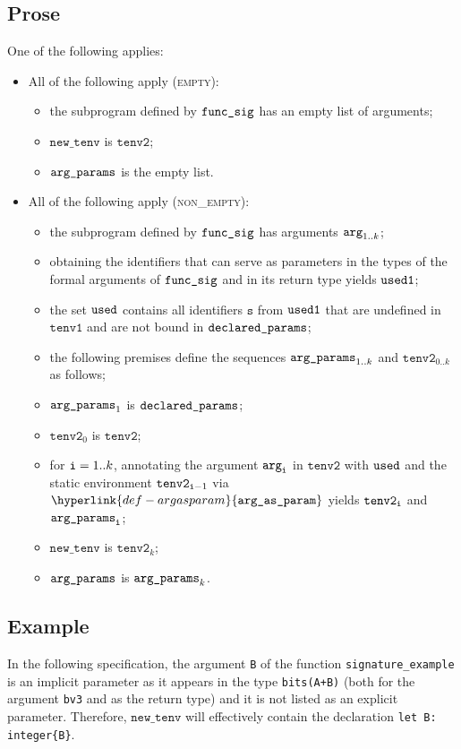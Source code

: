\documentclass{book}
\newcommand\ProseOrTypeError[0]{\ProseTerminateAs{\TypeErrorConfig}}
\newcommand\argasparam[0]{\hyperlink{def-argasparam}{\texttt{arg\_as\_param}}}
\newcommand\newtenv[0]{\texttt{new\_tenv}}
\newcommand\tenvone[0]{\texttt{tenv1}}
\newcommand\tenvtwo[0]{\texttt{tenv2}}
\newcommand\vs[0]{\texttt{s}}
\begin{document}
\subsection{Prose}
One of the following applies:
\begin{itemize}
  \item All of the following apply (\textsc{empty}):
  \begin{itemize}
    \item the subprogram defined by $\texttt{func\_sig}$ has an empty list of arguments;
    \item $\newtenv$ is $\tenvtwo$;
    \item $\texttt{arg\_params}$ is the empty list.
  \end{itemize}

  \item All of the following apply (\textsc{non\_empty}):
  \begin{itemize}
    \item the subprogram defined by $\texttt{func\_sig}$ has arguments $\texttt{arg}_{1..k}$;
    \item obtaining the identifiers that can serve as parameters in the types of the formal arguments of $\texttt{func\_sig}$
          and in its return type yields $\texttt{used1}$;
    \item the set $\texttt{used}$ contains all identifiers $\vs$ from $\texttt{used1}$ that are undefined in $\tenvone$ and are not
          bound in $\texttt{declared\_params}$;
    \item the following premises define the sequences $\texttt{arg\_params}_{1..k}$ and $\tenvtwo_{0..k}$ as follows;
    \item $\texttt{arg\_params}_1$ is $\texttt{declared\_params}$;
    \item $\tenvtwo_0$ is $\tenvtwo$;
    \item for $\texttt{i}=1..k$, annotating the argument $\texttt{arg}_{\texttt{i}}$ in $\tenvtwo$ with $\texttt{used}$ and the static environment $\tenvtwo_{\vi-1}$
          via $\argasparam$ yields $\tenvtwo_\vi$ and $\texttt{arg\_params}_{\texttt{i}}$\ProseOrTypeError;
    \item $\newtenv$ is $\tenvtwo_k$;
    \item $\texttt{arg\_params}$ is $\texttt{arg\_params}_k$.
  \end{itemize}
\end{itemize}

\subsection{Example}
In the following specification, the argument \texttt{B}
of the function \texttt{signature\_example} is an implicit parameter
as it appears in the type \texttt{bits(A+B)}
(both for the argument \texttt{bv3} and as the return type)
and it is not listed as an explicit parameter.
Therefore, $\newtenv$ will effectively contain the declaration \verb|let B: integer{B}|.
\end{document}
